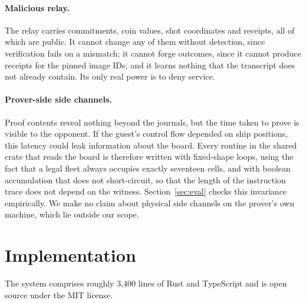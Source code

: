\documentclass[11pt,a4paper]{article}
\begin{document}
\paragraph{Malicious relay.} The relay carries commitments, coin values, shot
coordinates and receipts, all of which are public. It cannot change any of them
without detection, since verification fails on a mismatch; it cannot forge
outcomes, since it cannot produce receipts for the pinned image IDs; and it
learns nothing that the transcript does not already contain. Its only real
power is to deny service.

\paragraph{Prover-side side channels.} Proof contents reveal nothing beyond the
journals, but the time taken to prove is visible to the opponent. If the
guest's control flow depended on ship positions, this latency could leak
information about the board. Every routine in the shared crate that reads the
board is therefore written with fixed-shape loops, using the fact that a legal
fleet always occupies exactly seventeen cells, and with boolean accumulation
that does not short-circuit, so that the length of the instruction trace does
not depend on the witness. Section~\ref{sec:eval} checks this invariance
empirically. We make no claim about physical side channels on the prover's own
machine, which lie outside our scope.

\section{Implementation}
\label{sec:impl}

The system comprises roughly 3{,}400 lines of Rust and TypeScript and is open
source under the MIT license.
\end{document}
